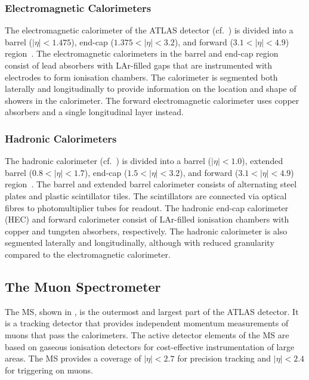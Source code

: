 \subsubsection{Electromagnetic Calorimeters}

The electromagnetic calorimeter of the ATLAS detector (cf.\
) is divided into a barrel ($|\eta| < 1.475$),
end-cap ($1.375 < |\eta| < 3.2$), and forward ($3.1 < |\eta| < 4.9$)
region~\cite{PERF-2007-01}. The electromagnetic calorimeters in the barrel and
end-cap region consist of lead absorbers with LAr-filled gaps that are
instrumented with electrodes to form ionisation chambers. The calorimeter is
segmented both laterally and longitudinally
to provide information on the location and shape of showers in the
calorimeter. The forward electromagnetic calorimeter uses copper absorbers and a
single longitudinal layer instead.


\subsubsection{Hadronic Calorimeters}

The hadronic calorimeter (cf.\ ) is divided into a
barrel ($|\eta| < 1.0$), extended barrel ($0.8 < |\eta| < 1.7$), end-cap
($1.5 < |\eta| < 3.2$), and forward ($3.1 < |\eta| < 4.9$)
region~\cite{PERF-2007-01}.  The barrel and extended barrel calorimeter consists
of alternating steel plates and plastic scintillator tiles. The scintillators
are connected via optical fibres to photomultiplier tubes for readout. The
hadronic end-cap calorimeter (HEC) and forward calorimeter consist of LAr-filled
ionisation chambers with copper and tungsten absorbers, respectively. The
hadronic calorimeter is also segmented laterally and longitudinally, although
with reduced granularity compared to the electromagnetic calorimeter.


\subsection{The Muon Spectrometer}%
\label{sec:atlas_ms}

The MS, shown in , is the outermost and largest part
of the ATLAS detector. It is a tracking detector that provides independent
momentum measurements of muons that pass the calorimeters. The active detector
elements of the MS are based on gaseous ionisation detectors for cost-effective
instrumentation of large areas. The MS provides a coverage of $|\eta| < 2.7$ for
precision tracking and $|\eta| < 2.4$ for triggering on muons.

